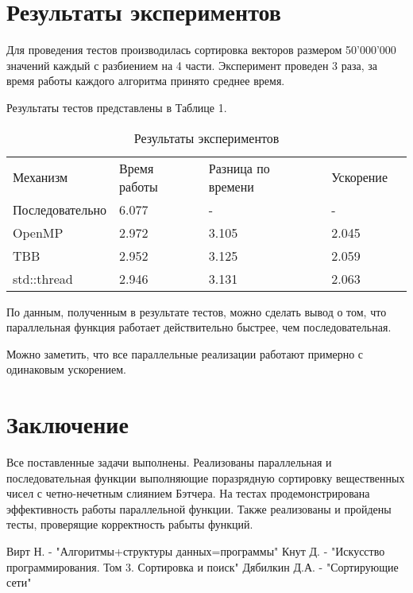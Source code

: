 \documentclass{report}
\begin{document}
\section*{Результаты экспериментов}
Для проведения тестов производилась сортировка векторов размером 50'000'000 значений каждый с разбиением на 4 части. Эксперимент проведен 3 раза, за время работы каждого алгоритма принято среднее время. 
\par Результаты тестов представлены в Таблице 1.
\begin{table}[!h]
\caption{Результаты экспериментов}
\centering
\begin{tabular}{lllll}
		Механизм        & Время работы    & Разница по времени & Ускорение  \\
		Последовательно & 6.077           & -                  & -          \\
		OpenMP          & 2.972           & 3.105              & 2.045      \\
		TBB             & 2.952           & 3.125              & 2.059      \\
		std::thread     & 2.946           & 3.131              & 2.063      
\end{tabular}
\end{table}
\par По данным, полученным в результате тестов, можно сделать вывод о том, что параллельная функция работает действительно быстрее, чем последовательная.
\par Можно заметить, что все параллельные реализации работают примерно с одинаковым ускорением.
\newpage
\section*{Заключение}
Все поставленные задачи выполнены. Реализованы параллельная и последовательная функции выполняющие поразрядную сортировку вещественных чисел с четно-нечетным слиянием Бэтчера. На тестах продемонстрирована эффективность работы параллельной функции. Также реализованы и пройдены тесты, проверящие корректность рабыты функций.
\newpage

\begin{thebibliography}{1}
	 Вирт Н. - "Алгоритмы+структуры данных=программы"
	 Кнут Д. - "Искусство программирования. Том 3. Сортировка и поиск"
	 Дябилкин Д.А. - "Сортирующие сети"
\end{thebibliography}
\newpage
\end{document}

